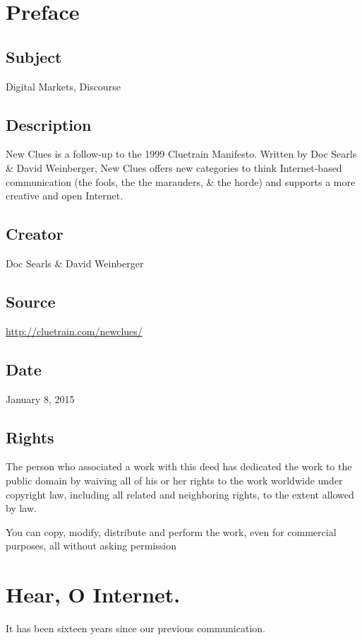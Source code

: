 \documentclass[letterpaper,12pt,english]{sphinxmanual}
\begin{document}
\section{Preface}
\label{2015newclues:preface}

\subsection{Subject}
\label{2015newclues:subject}
Digital Markets, Discourse


\subsection{Description}
\label{2015newclues:description}
New Clues is a follow-up to the 1999 Cluetrain Manifesto. Written by Doc Searls \& David Weinberger, New Clues offers new categories to think Internet-based communication (the fools, the the marauders, \& the horde) and supports a more creative and open Internet.


\subsection{Creator}
\label{2015newclues:creator}
Doc Searls \& David Weinberger


\subsection{Source}
\label{2015newclues:source}
\href{http://cluetrain.com/newclues/}{http://cluetrain.com/newclues/}


\subsection{Date}
\label{2015newclues:date}
January 8, 2015


\subsection{Rights}
\label{2015newclues:rights}
The person who associated a work with this deed has dedicated the work to the public domain by waiving all of his or her rights to the work worldwide under copyright law, including all related and neighboring rights, to the extent allowed by law.

You can copy, modify, distribute and perform the work, even for commercial purposes, all without asking permission


\section{Hear, O Internet.}
\label{2015newclues:hear-o-internet}
It has been sixteen years since our previous communication.
\end{document}
